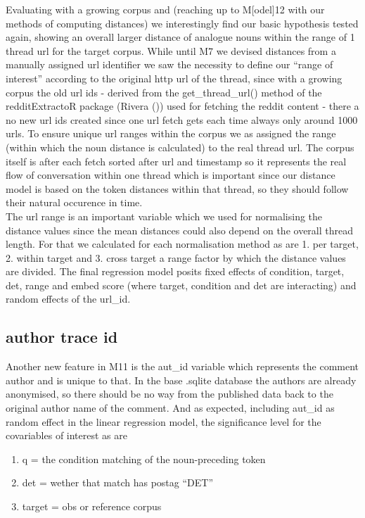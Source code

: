 \documentclass[
  12pt,
  oneside]{book}
\providecommand{\tightlist}{%
  \setlength{\itemsep}{0pt}\setlength{\parskip}{0pt}}
\begin{document}
Evaluating with a growing corpus and (reaching up to M{[}odel{]}12 with our methods of computing distances) we interestingly find our basic hypothesis tested again, showing an overall larger distance of analogue nouns within the range of 1 thread url for the target corpus. While until M7 we devised distances from a manually assigned url identifier we saw the necessity to define our ``range of interest'' according to the original http url of the thread, since with a growing corpus the old url ids - derived from the get\_thread\_url() method of the redditExtractoR package (Rivera ()) used for fetching the reddit content - there a no new url ids created since one url fetch gets each time always only around 1000 urls. To ensure unique url ranges within the corpus we as assigned the range (within which the noun distance is calculated) to the real thread url. The corpus itself is after each fetch sorted after url and timestamp so it represents the real flow of conversation within one thread which is important since our distance model is based on the token distances within that thread, so they should follow their natural occurence in time.\\
The url range is an important variable which we used for normalising the distance values since the mean distances could also depend on the overall thread length. For that we calculated for each normalisation method as are 1. per target, 2. within target and 3. cross target a range factor by which the distance values are divided. The final regression model posits fixed effects of condition, target, det, range and embed score (where target, condition and det are interacting) and random effects of the url\_id.

\subsection{author trace id}\label{author-trace-id}

Another new feature in M11 is the aut\_id variable which represents the comment author and is unique to that. In the base .sqlite database the authors are already anonymised, so there should be no way from the published data back to the original author name of the comment. And as expected, including aut\_id as random effect in the linear regression model, the significance level for the covariables of interest as are

\begin{enumerate}
\def\labelenumi{\arabic{enumi}.}
\tightlist
\item
  q = the condition matching of the noun-preceding token
\item
  det = wether that match has postag ``DET''
\item
  target = obs or reference corpus
\end{enumerate}
\end{document}
